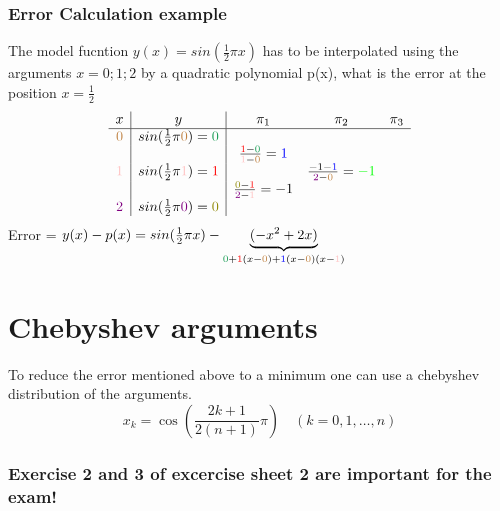\subsubsection{Error Calculation example}
The model fucntion $y(x)=sin(\frac{1}{2}\pi x)$ has to be interpolated using the arguments $x=0;1;2$ by a quadratic polynomial p(x), what is the error at the position $x=\frac{1}{2}$
\[
	\begin{array}{c|c|ccc}
 x & y & \pi_1 & \pi_2 &\pi_3\\
\hline
	\textcolor{brown}{0} & sin(\frac{1}{2}\pi \textcolor{brown}{0})=\textcolor{ForestGreen}{0}\\
	    &     & \frac{\textcolor{red}{1}-\textcolor{ForestGreen}{0}}{\textcolor{pink}{1}-\textcolor{brown}{0}}=\textcolor{blue}{1} \\
	\textcolor{pink}{1} & sin(\frac{1}{2}\pi \textcolor{pink}{1})=\textcolor{red}{1}&             & \frac{-1-\textcolor{blue}{1}}{\textcolor{violet}{2}-\textcolor{brown}{0}}=\textcolor{green}{-1}\\
	    &     & \frac{\textcolor{olive}{0}-\textcolor{red}{1}}{\textcolor{violet}{2}-\textcolor{pink}{1}}=-1  & \\             
	\textcolor{violet}{2} & sin(\frac{1}{2}\pi \textcolor{violet}{0})=\textcolor{olive}{0}&                    

	\end{array}
\]
Error = $y(x)-p(x)=sin(\frac{1}{2}\pi x)-\underbrace{(-x^2+2x)}_{\textcolor{ForestGreen}{0}+\textcolor{red}{1}(x-\textcolor{brown}{0})+\textcolor{blue}{1}(x-\textcolor{brown}{0})(x-\textcolor{pink}{1})}$
\section{Chebyshev arguments}
To reduce the error mentioned above to a minimum one can use a chebyshev distribution of the arguments.
$$
x_k=\cos \left(\frac{2 k+1}{2(n+1)} \pi\right) \quad(k=0,1, \ldots, n)
$$
\subsubsection{Exercise 2 and 3 of excercise sheet 2 are important for the exam!}